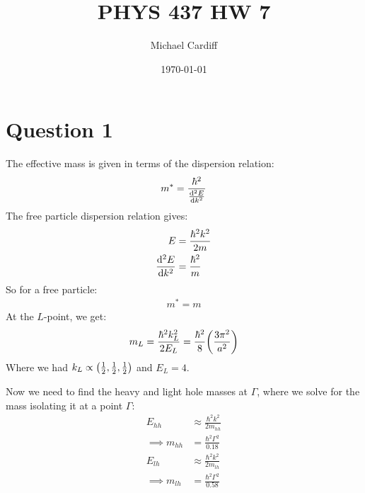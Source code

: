\documentclass[12pt]{article}
\title{\vspace{-3em}PHYS 437 HW 7}
\author{Michael Cardiff}
\date{\today}
\begin{document}
\maketitle
\section*{Question 1}
The effective mass is given in terms of the dispersion relation:
\begin{align*}
  m^*=\frac{\hbar^2}{\dv[2]{E}{k}}
\end{align*}
The free particle dispersion relation gives:
\begin{align*}
  E&=\frac{\hbar^2k^2}{2m}\\
  \dv[2]{E}{k}&=\frac{\hbar^2}{m}
\end{align*}
So for a free particle:
\begin{align*}
  \boxed{m^*=m}
\end{align*}
At the $L$-point, we get:
\begin{align*}
  m_L=\frac{\hbar^2k_L^2}{2E_L}=\frac{\hbar^2}{8}\qty(\frac{3\pi^2}{a^2})
\end{align*}
Where we had $k_L\propto\qty(\frac{1}{2},\frac{1}{2},\frac{1}{2})$ and $E_L=4$.

Now we need to find the heavy and light hole masses at $\Gamma$, where we solve for the mass isolating it at a point $\Gamma$:
\begin{align*}
  E_{hh}&\approx\frac{\hbar^2k^2}{2m_{hh}}\\
  \implies m_{hh}&=\frac{\hbar^2\Gamma^2}{0.18}\\
  E_{lh}&\approx\frac{\hbar^2k^2}{2m_{lh}}\\
  \implies m_{lh}&=\frac{\hbar^2\Gamma^2}{0.58}
\end{align*}
\end{document}

